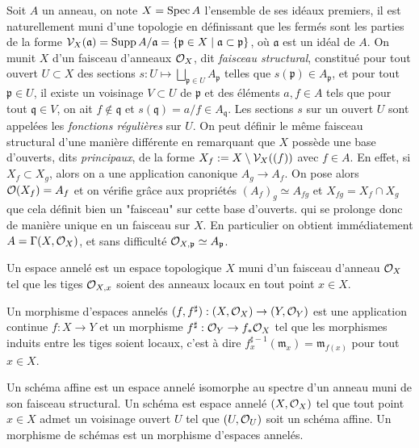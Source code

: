 Soit $A$ un anneau, on note $X=\operatorname{Spec} A$ l'ensemble de ses idéaux premiers, il est naturellement muni d'une topologie en définissant que les fermés sont les parties de la forme $\mathcal{V}_X(\mathfrak{a})=\operatorname{Supp} A/\mathfrak{a}=\lbrace \mathfrak{p}\in X\mid \mathfrak{a}\subset \mathfrak{p}\rbrace$, où $\mathfrak{a}$ est un idéal de $A$. On munit $X$ d'un faisceau d'anneaux $\mathcal{O}_X$, dit \textit{faisceau structural}, constitué pour tout ouvert $U\subset X$ des sections $s: U\mapsto \bigsqcup_{\mathfrak{p}\in U}A_\mathfrak{p}$ telles que $s(\mathfrak{p})\in A_\mathfrak{p}$, et pour tout $\mathfrak{p}\in U$, il existe un voisinage $V\subset U$ de $\mathfrak{p}$ et des éléments $a,f\in A$ tels que pour tout $\mathfrak{q}\in V$, on ait $f\notin \mathfrak{q}$ et $s(\mathfrak{q})=a/f\in A_\mathfrak{q}$. Les sections $s$ sur un ouvert $U$ sont appelées les \textit{fonctions régulières} sur $U$. On peut définir le même faisceau structural d'une manière différente en remarquant que $X$ possède une base d'ouverts, dits \textit{principaux}, de la forme $X_f:=X\setminus \mathcal{V}_X((f))$ avec $f\in A$. En effet, si $X_f\subset X_g$, alors on a une application canonique $A_g\rightarrow A_f$. On pose alors $\mathcal{O}(X_f)=A_f$ et on vérifie grâce aux propriétés $(A_f)_g\simeq A_{fg}$ et $X_{fg}=X_f\cap X_g$ que cela définit bien un "faisceau" sur cette base d'ouverts. qui se prolonge donc de manière unique en un faisceau sur $X$. En particulier on obtient immédiatement $A=\Gamma(X, \mathcal{O}_X)$, et sans difficulté $\mathcal{O}_{X,\mathfrak{p}}\simeq A_\mathfrak{p}$. 

\begin{defn}
Un espace annelé est un espace topologique $X$ muni d'un faisceau d'anneau $\mathcal{O}_X$ tel que les tiges $\mathcal{O}_{X,x}$ soient des anneaux locaux en tout point $x\in X$.

Un morphisme d'espaces annelés $(f, f^\sharp):(X,\mathcal{O}_X)\rightarrow (Y,\mathcal{O}_Y)$ est une application continue $f:X\rightarrow Y$ et un morphisme $f^\sharp:\mathcal{O}_Y\rightarrow f_*\mathcal{O}_X$ tel que les morphismes induits entre les tiges soient locaux, c'est à dire $f^{\sharp -1}_x(\mathfrak{m}_x)=\mathfrak{m}_{f(x)}$ pour tout $x\in X$.
\end{defn}

\begin{defn}
Un schéma affine est un espace annelé isomorphe au spectre d'un anneau muni de son faisceau structural. Un schéma est espace annelé $(X,\mathcal{O}_X)$ tel que tout point $x\in X$ admet un voisinage ouvert $U$ tel que $(U,\mathcal{O}_U)$ soit un schéma affine. Un morphisme de schémas est un morphisme d'espaces annelés.
\end{defn}

